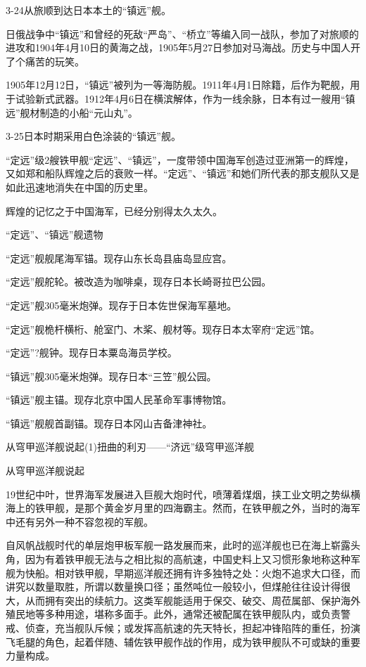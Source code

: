 \documentclass[12pt,UTF8]{ctexbook}
\begin{document}
3-24从旅顺到达日本本土的“镇远”舰。

日俄战争中“镇远”和曾经的死敌“严岛”、“桥立”等编入同一战队，参加了对旅顺的进攻和1904年4月10日的黄海之战，1905年5月27日参加对马海战。历史与中国人开了个痛苦的玩笑。

1905年12月12日，“镇远”被列为一等海防舰。1911年4月1日除籍，后作为靶舰，用于试验新式武器。1912年4月6日在横滨解体，作为一线余脉，日本有过一艘用“镇远”舰材制造的小船“元山丸”。

3-25日本时期采用白色涂装的“镇远”舰。

“定远”级2艘铁甲舰“定远”、“镇远”，一度带领中国海军创造过亚洲第一的辉煌，又如郑和船队辉煌之后的衰败一样。“定远”、“镇远”和她们所代表的那支舰队又是如此迅速地消失在中国的历史里。

辉煌的记忆之于中国海军，已经分别得太久太久。

“定远”、“镇远”舰遗物

“定远”舰舰尾海军锚。现存山东长岛县庙岛显应宫。

“定远”舰舵轮。被改造为咖啡桌，现存日本长崎哥拉巴公园。

“定远”舰305毫米炮弹。现存于日本佐世保海军墓地。

“定远”舰桅杆横桁、舱室门、木桨、舰材等。现存日本太宰府“定远”馆。

“定远”?舰钟。现存日本粟岛海员学校。

“镇远”舰305毫米炮弹。现存日本“三笠”舰公园。

“镇远”舰主锚。现存北京中国人民革命军事博物馆。

“镇远”舰舰首副锚。现存日本冈山吉备津神社。

从穹甲巡洋舰说起(1)扭曲的利刃——“济远”级穹甲巡洋舰

从穹甲巡洋舰说起

19世纪中叶，世界海军发展进入巨舰大炮时代，喷薄着煤烟，挟工业文明之势纵横海上的铁甲舰，是那个黄金岁月里的四海霸主。然而，在铁甲舰之外，当时的海军中还有另外一种不容忽视的军舰。

自风帆战舰时代的单层炮甲板军舰一路发展而来，此时的巡洋舰也已在海上崭露头角，因为有着铁甲舰无法与之相比拟的高航速，中国史料上又习惯形象地称这种军舰为快船。相对铁甲舰，早期巡洋舰还拥有许多独特之处：火炮不追求大口径，而讲究以数量取胜，所谓以数量换口径；虽然吨位一般较小，但煤舱往往设计得很大，从而拥有突出的续航力。这类军舰能适用于保交、破交、周莅属部、保护海外殖民地等多种用途，堪称多面手。此外，通常还被配属在铁甲舰队内，或负责警戒、侦查，充当舰队斥候；或发挥高航速的先天特长，担起冲锋陷阵的重任，扮演飞毛腿的角色，起着伴随、辅佐铁甲舰作战的作用，成为铁甲舰队不可或缺的重要力量构成。
\end{document}
